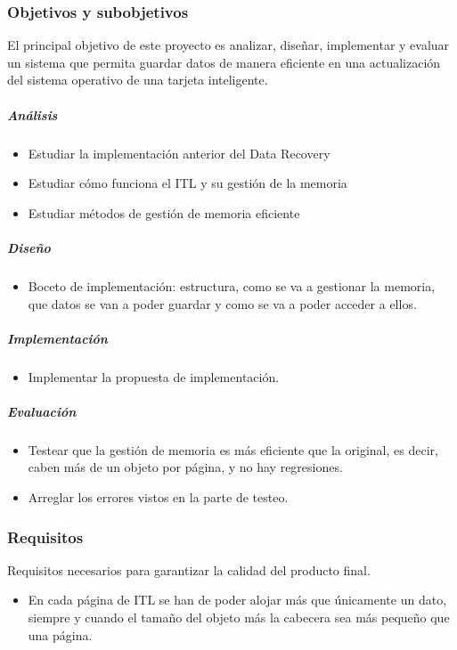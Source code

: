 \documentclass[12pt]{article}
\begin{document}
	\subsubsection{Objetivos y subobjetivos}
	El principal objetivo de este proyecto es analizar, diseñar,  implementar y evaluar un sistema que permita guardar datos de manera eficiente en una actualización del sistema operativo de una tarjeta inteligente.
	
	
	\subparagraph{Análisis}
	\begin{itemize}
        \item Estudiar la implementación anterior del Data Recovery
        \item Estudiar cómo funciona el ITL y su gestión de la memoria
        \item Estudiar métodos de gestión de memoria eficiente 
    \end{itemize}
    
    
    \subparagraph{Diseño}
	\begin{itemize}
        \item Boceto de implementación: estructura, como se va a gestionar la memoria, que datos se van a poder guardar y como se va a poder acceder a ellos.
    \end{itemize}
    
    \subparagraph{Implementación}
	\begin{itemize}
        \item Implementar la propuesta de implementación.
    \end{itemize}

    \subparagraph{Evaluación}
	\begin{itemize}
        \item Testear que la gestión de memoria es más eficiente que la original, es decir, caben más de un objeto por página, y no hay regresiones.
        \item Arreglar los errores vistos en la parte de testeo.
    \end{itemize}	

	\subsubsection{Requisitos}
	Requisitos necesarios para garantizar la calidad del producto final.
	\begin{itemize}
        \item En cada página de ITL se han de poder alojar más que únicamente un dato, siempre y cuando el tamaño del objeto más la cabecera sea más pequeño que una página.
    \end{itemize}
\end{document}
